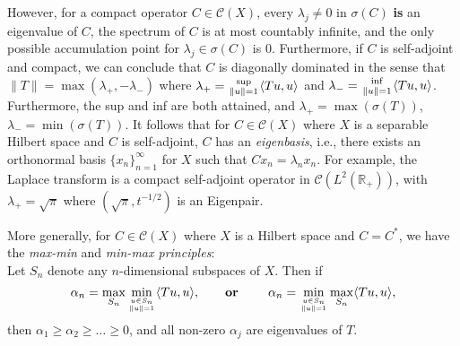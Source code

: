 \documentclass[12pt]{article}
\begin{document}
However, for a compact operator $C \in \mathcal{C}(X)$, every
$\lambda_j \neq 0$ in $\sigma(C)$ {\bf is} an eigenvalue of $C$, the
spectrum of $C$ is at most countably infinite, and the only possible
accumulation point for $\lambda_j \in \sigma(C)$ is $0$. Furthermore,
if $C$ is self-adjoint and compact, we can conclude that $C$ is
diagonally dominated in the sense that $\|T\| = \max(\lambda_+, -\lambda_-)$
where $\lambda_+={\sup\atop\|u\|=1}\langle Tu,u\rangle$
and $\lambda_-={\inf\atop\|u\|=1}\langle Tu,u\rangle$.
Furthermore, the sup and inf are both attained, and
$\lambda_+ = \max(\sigma(T))$, $\lambda_- = \min(\sigma(T))$.
It follows that for $C\in\mathcal{C}(X)$ where $X$ is a separable Hilbert
space and $C$ is self-adjoint, $C$ has an {\it eigenbasis}, i.e., there
exists an orthonormal basis $\{x_n\}_{n=1}^\infty$ for $X$ such that
$Cx_n = \lambda_n x_n$. For example, the Laplace transform is a compact
self-adjoint operator in $\mathcal{C}(L^2(\mathbb{R}_+))$, with
$\lambda_+ = \sqrt{\pi}$ where $(\sqrt{\pi},t^{-1/2})$ is an Eigenpair.

More generally, for $C\in\mathcal{C}(X)$ where $X$ is a Hilbert space and
$C=C^*$, we have the {\it max-min} and {\it min-max principles}:\\
Let $S_n$ denote any $n$-dimensional subspaces of $X$. Then if
$$
\alpha_n=\max_{S_n}\min_{u\in S_n\atop\|u\|=1}\langle Tu,u\rangle,
\qquad\text{\bf or }\qquad
\alpha_n=\min_{u\in S_n\atop\|u\|=1}\max_{S_n}\langle Tu,u\rangle,
$$
then $\alpha_1 \geq \alpha_2 \geq \ldots \geq 0$, and all non-zero
$\alpha_j$ are eigenvalues of $T$.
\end{document}
